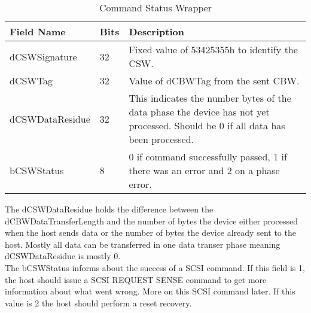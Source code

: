\begin{table}[ht]
\caption{Command Status Wrapper}
\centering
\begin{tabular}{|l|l|p{9cm}|}
\hline\hline
\textbf{Field Name} & \textbf{Bits} & \textbf{Description}\\ \hline
dCSWSignature & 32 & Fixed value of 53425355h to identify the CSW. \\ \hline
dCSWTag & 32 & Value of dCBWTag from the sent CBW. \\ \hline
dCSWDataResidue & 32 & This indicates the number bytes of the data phase the device has not yet processed. Should be 0 if all data has been processed. \\ \hline
bCSWStatus & 8 & 0 if command successfully passed, 1 if there was an error and 2 on a phase error. \\ \hline
\end{tabular}
\label{table:csw}
\end{table}

The dCSWDataResidue holds the difference between the dCBWDataTransferLength and the number of bytes the device either processed when the host sends data or the number of bytes the device already sent to the host. Mostly all data can be transferred in one data transer phase meaning dCSWDataResidue is mostly 0. \\
The bCSWStatus informs about the success of a SCSI command. If this field is 1, the host should issue a SCSI REQUEST SENSE command to get more information about what went wrong. More on this SCSI command later. If this value is 2 the host should perform a reset recovery. 
